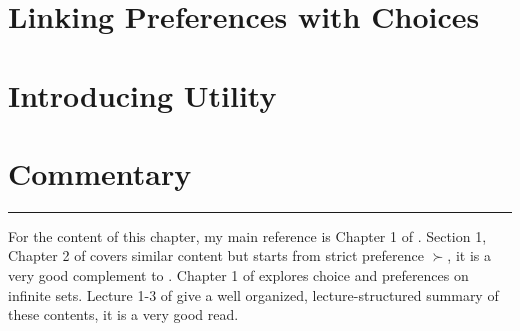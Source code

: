 \section{Linking Preferences with Choices}\label{chap1:sec3}


\section{Introducing Utility}\label{chap1:sec4}


\section{Commentary}\label{chap1:sec5}
%

\vspace{0.5cm}
\noindent\rule{\textwidth}{0.4pt}

For the content of this chapter, my main reference is Chapter 1 of \citet{mas1995microeconomic}. Section 1, Chapter 2 of \citet{kreps1990acourse} covers similar content but starts from strict preference $\succ$, it is a very
good complement to \citet{mas1995microeconomic}. Chapter 1 of \citet{kreps2013microeconomic} explores choice and preferences on infinite sets. Lecture 1-3 of \citet{ariel2012lecture} give a well organized, lecture-structured summary of
these contents, it is a very good read.